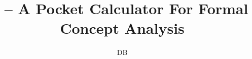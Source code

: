 \documentclass{scrbook}
\title{\cclj\ -- A Pocket Calculator For Formal Concept Analysis}
\author{DB}
\begin{document}
\listoftodos

\maketitle



\tableofcontents










\end{document}
